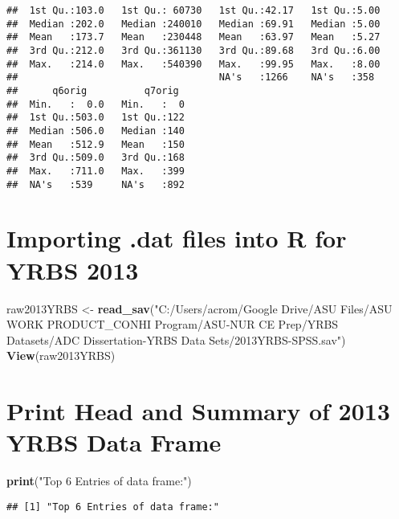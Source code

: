 \documentclass[
]{article}
\newenvironment{Shaded}{\begin{snugshade}}{\end{snugshade}}
\newcommand{\FunctionTok}[1]{\textcolor[rgb]{0.13,0.29,0.53}{\textbf{#1}}}
\newcommand{\NormalTok}[1]{#1}
\newcommand{\OtherTok}[1]{\textcolor[rgb]{0.56,0.35,0.01}{#1}}
\newcommand{\StringTok}[1]{\textcolor[rgb]{0.31,0.60,0.02}{#1}}
\begin{document}
\begin{verbatim}
##  1st Qu.:103.0   1st Qu.: 60730   1st Qu.:42.17   1st Qu.:5.00  
##  Median :202.0   Median :240010   Median :69.91   Median :5.00  
##  Mean   :173.7   Mean   :230448   Mean   :63.97   Mean   :5.27  
##  3rd Qu.:212.0   3rd Qu.:361130   3rd Qu.:89.68   3rd Qu.:6.00  
##  Max.   :214.0   Max.   :540390   Max.   :99.95   Max.   :8.00  
##                                   NA's   :1266    NA's   :358   
##      q6orig          q7orig   
##  Min.   :  0.0   Min.   :  0  
##  1st Qu.:503.0   1st Qu.:122  
##  Median :506.0   Median :140  
##  Mean   :512.9   Mean   :150  
##  3rd Qu.:509.0   3rd Qu.:168  
##  Max.   :711.0   Max.   :399  
##  NA's   :539     NA's   :892
\end{verbatim}

\hypertarget{importing-.dat-files-into-r-for-yrbs-2013}{%
\section{Importing .dat files into R for YRBS
2013}\label{importing-.dat-files-into-r-for-yrbs-2013}}

\begin{Shaded}
\begin{Highlighting}[]
\NormalTok{raw2013YRBS }\OtherTok{\textless{}{-}} \FunctionTok{read\_sav}\NormalTok{(}\StringTok{"C:/Users/acrom/Google Drive/ASU Files/ASU WORK PRODUCT\_CONHI Program/ASU{-}NUR CE Prep/YRBS Datasets/ADC Dissertation{-}YRBS Data Sets/2013YRBS{-}SPSS.sav"}\NormalTok{)}
\FunctionTok{View}\NormalTok{(raw2013YRBS)}
\end{Highlighting}
\end{Shaded}

\hypertarget{print-head-and-summary-of-2013-yrbs-data-frame}{%
\section{Print Head and Summary of 2013 YRBS Data
Frame}\label{print-head-and-summary-of-2013-yrbs-data-frame}}

\begin{Shaded}
\begin{Highlighting}[]
\FunctionTok{print}\NormalTok{(}\StringTok{"Top 6 Entries of data frame:"}\NormalTok{)}
\end{Highlighting}
\end{Shaded}

\begin{verbatim}
## [1] "Top 6 Entries of data frame:"
\end{verbatim}
\end{document}
